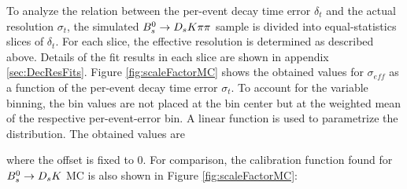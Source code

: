 To analyze the relation between the per-event decay time error $\delta_t$ and the actual resolution $\sigma_{t}$, 
the simulated ${{B}^0_{s}}\rightarrow{\ensuremath{{D}_{s}}}{\ensuremath{K}}{\ensuremath{\pi}}{\ensuremath{\pi}}$ sample is divided into equal-statistics slices of $\delta_t$. 
For each slice, the effective resolution is determined as described above.
Details of the fit results in each slice are shown in appendix \ref{sec:DecResFits}. 
%
%
%
Figure \ref{fig:scaleFactorMC} shows the obtained values for $\sigma_{eff}$ as a function of the per-event decay time error $\sigma_{t}$. 
To account for the variable binning, the bin values are not placed at the bin center but at the weighted mean of the respective per-event-error bin.
A linear function 
is used to parametrize the distribution. 
The obtained values are 

where 
the offset is fixed to 0.
For comparison, the calibration function found for ${{B}^0_{s}}\rightarrow{\ensuremath{{D}_{s}}}{\ensuremath{K}}$ MC is also shown in Figure \ref{fig:scaleFactorMC}\cite{Aaij:2017lff}: 
